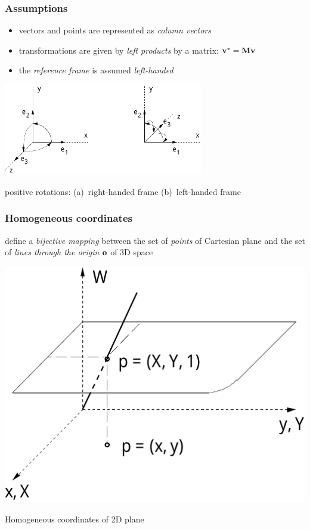 \documentclass{beamer}
\begin{document}
\begin{frame}\frametitle{Assumptions}\small

\vfill
\begin{itemize}
\vfill\item vectors and points are represented as \emph{column vectors}

\vfill\item\vspace{-1mm} transformations are given by \emph{left products} by a matrix: ${\bf v}^*={\bf M}{\bf v}$

\vfill\item\vspace{-1mm} the \emph{reference frame} is assumed \emph{left-handed }
\end{itemize}

\vfill

\begin{center}
\includegraphics[height=40mm]{images/riferimenti1}
\end{center}

\alert{positive rotations}: (a)~right-handed frame
(b)~left-handed frame

\end{frame}
\begin{frame}\frametitle{Homogeneous coordinates}\small

\vfill

define a \emph{bijective mapping} between the set of \emph{points} of Cartesian plane and the set of \emph{lines through the origin} ${\bf o}$ of 3D space

\vfill
\begin{center}
\includegraphics[width=0.5\linewidth]{images/omogenee}
\end{center}
\vfill

{Homogeneous coordinates of 2D plane}

\end{frame}
\end{document}
